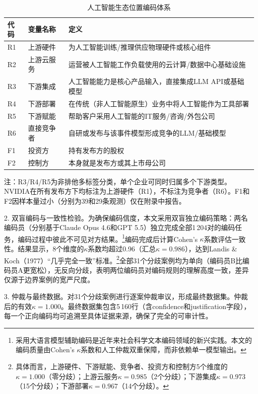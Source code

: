 \documentclass[11pt,fontset=fandol,a4paper]{ctexart}
\newcommand{\changed}[1]{#1}
\newcommand{\revise}[1]{#1}
\begin{document}
\begin{table}[H]
\centering
\small
\caption{人工智能生态位置编码体系}
\label{tab:codebook}
\begin{tabularx}{0.96\textwidth}{llX}
\toprule
代码 & 变量名称 & 定义 \\
\midrule
R1 & 上游硬件 & 为人工智能训练/推理供应物理硬件或核心组件 \\
R2 & 上游云服务 & 运营被人工智能工作负载使用的云计算/数据中心基础设施 \\
R3 & 下游集成 & 人工智能能力是核心产品输入，直接集成LLM API或基础模型 \\
R4 & 下游部署 & 在传统（非人工智能原生）业务中将人工智能作为工具部署 \\
R5 & 下游赋能 & 帮助客户采用人工智能的IT服务/咨询/外包公司 \\
R6 & 直接竞争者 & 自研或发布与该事件模型形成竞争的LLM/基础模型 \\
F1 & 投资方 & 持有发布方的股权 \\
F2 & 控制方 & 本身就是发布方或其上市母公司 \\
\bottomrule
\end{tabularx}
\begin{minipage}{0.94\linewidth}
\vspace{0.4em}
\footnotesize
注：\revise{R3/R4/R5为非排他多标签分类，单个企业可同时归属多个下游类型}。NVIDIA在所有发布方下均标注为上游硬件（R1），不标注为竞争者（R6）。F1和F2因样本量过小（分别为39和29条观测）仅在附录中报告。
\end{minipage}
\end{table}

\changed{2. 双盲编码与一致性检验。为确保编码信度，本文采用双盲独立编码策略：两名编码员（分别基于Claude Opus 4.6和GPT 5.5）独立完成全部1\,204对的编码任务，编码过程中彼此不可见对方结果。\footnote{采用大语言模型辅助编码是近年来社会科学文本编码领域的新兴实践。本文的编码质量由Cohen's $\kappa$系数和人工仲裁双重保障，而非依赖单一模型输出。}编码完成后计算Cohen's $\kappa$系数评估一致性。结果显示，8个维度的$\kappa$系数均超过0.96（汇总$\kappa=0.986$），达到Landis \& Koch（1977）“几乎完全一致”标准。\footnote{具体而言，上游硬件、下游赋能、竞争者、投资方和控制方5个维度的$\kappa=1.000$（零分歧）；上游云服务$\kappa=0.985$（2个分歧）；下游集成$\kappa=0.973$（15个分歧）；下游部署$\kappa=0.967$（14个分歧）。}全部31个分歧案例均为单向（编码员B比编码员A更宽松），无反向分歧，表明两位编码员对编码规则的理解高度一致，差异仅源于边界案例的宽严尺度。}

3. 仲裁与最终数据。对31个分歧案例进行逐案仲裁审议，形成最终数据集。仲裁后的有效$\kappa=1.000$。最终数据集包含5\,160行（含confidence和justification字段），每一个正向编码均可追溯至具体证据来源，确保了完全的可审计性。
\end{document}
